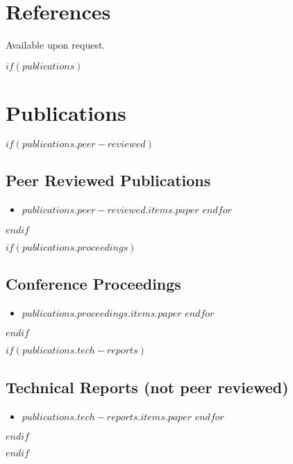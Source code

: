 \documentclass[letterpaper,10pt,final]{moderncv}
\begin{document}
\section{References}
Available upon request.

$if(publications)$
\section{Publications}
$if(publications.peer-reviewed)$
\subsection{Peer Reviewed Publications}
\begin{itemize}
$for(publications.peer-reviewed.items)$
\item $publications.peer-reviewed.items.paper$
$endfor$
\end{itemize}
$endif$

$if(publications.proceedings)$
\subsection{Conference Proceedings}
\begin{itemize}
$for(publications.proceedings.items)$
\item $publications.proceedings.items.paper$
$endfor$
\end{itemize}
$endif$

$if(publications.tech-reports)$
\subsection{Technical Reports (not peer reviewed)}
\begin{itemize}
$for(publications.tech-reports.items)$
\item $publications.tech-reports.items.paper$
$endfor$
\end{itemize}
$endif$

$endif$


\end{document}
